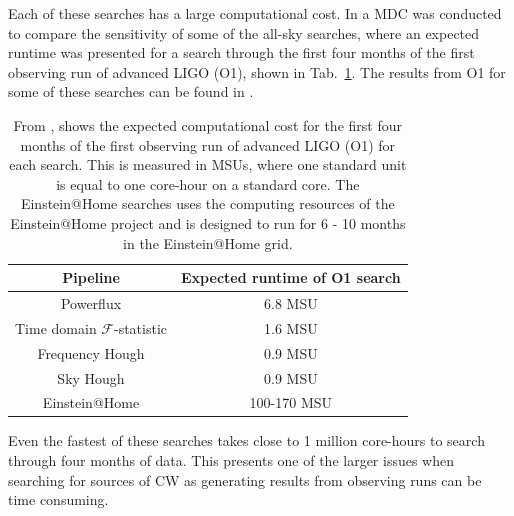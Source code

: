 Each of these searches has a large computational cost. In \citep{walsh2016ComparisonMethods} a
\gls{MDC} was conducted to compare the sensitivity of some of the all-sky 
searches, where an expected runtime was presented for a search through the first four months of the first observing run of advanced \gls{LIGO} (O1), shown in Tab.~\ref{searchcw:search:semi:cost}. 
The results from O1 for some of these searches can be found in \citep{ligoscientificcollaborationandvirgocollaboration2017AllskySearch}.  
%
\begin{table}
	\centering
        \caption[Computational cost of \gls{CW} searches.]{From
\citep{walsh2016ComparisonMethods}, shows the expected computational cost for the first
four months of the first observing run of advanced \gls{LIGO} (O1) for each search. This is measured in \glspl{MSU}, where one
standard unit is equal to one core-hour on a standard core.
The Einstein@Home searches uses the computing resources
of the Einstein@Home project and is designed to run for 6 - 10 months in the
Einstein@Home grid.
  \label{searchcw:search:semi:cost}}
	
        \bgroup {} \centering \begin{tabular}{|c c|} \hline
Pipeline & Expected runtime of O1 search \\ \hline Powerflux & 6.8 MSU \\

		Time domain $\mathcal{F}$-statistic & 1.6 MSU\\

		Frequency Hough & 0.9 MSU \\

		Sky Hough & 0.9 MSU\\
		\hline
		Einstein@Home & 100-170 MSU\\
		\hline

	\end{tabular}
	\egroup
\end{table}
%
Even the fastest of these searches takes close to 1 million core-hours to
search through four months of data. 
This presents one of the larger issues when searching for sources of \gls{CW} as generating results from observing runs can be time consuming. 


